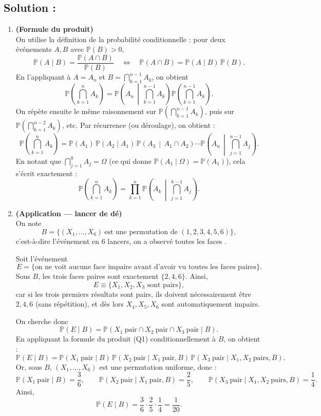 \subsection*{Solution :}


\begin{enumerate}
\item \textbf{(Formule du produit)}\\
On utilise la définition de la probabilité conditionnelle : pour deux événements $A,B$ avec $\mathbb{P}(B)>0$,
\[
\mathbb{P}(A\mid B)=\frac{\mathbb{P}(A\cap B)}{\mathbb{P}(B)}
\quad\Longleftrightarrow\quad
\mathbb{P}(A\cap B)=\mathbb{P}(A\mid B)\,\mathbb{P}(B).
\]
En l'appliquant à $A=A_n$ et $B=\bigcap_{k=1}^{n-1}A_k$, on obtient
\[
\mathbb{P}\!\left(\bigcap_{k=1}^{n}A_k\right)
=
\mathbb{P}\!\left(A_n \,\middle|\, \bigcap_{k=1}^{n-1}A_k\right)
\mathbb{P}\!\left(\bigcap_{k=1}^{n-1}A_k\right).
\]
On répète ensuite le même raisonnement sur $\mathbb{P}\!\left(\bigcap_{k=1}^{n-1}A_k\right)$, puis sur
$\mathbb{P}\!\left(\bigcap_{k=1}^{n-2}A_k\right)$, etc. Par récurrence (ou déroulage), on obtient :
\[
\mathbb{P}\left(\bigcap_{k=1}^n A_k\right)
=
\mathbb{P}(A_1)\,
\mathbb{P}(A_2\mid A_1)\,
\mathbb{P}\!\left(A_3 \,\middle|\, A_1\cap A_2\right)\cdots
\mathbb{P}\!\left(A_n \,\middle|\, \bigcap_{j=1}^{n-1}A_j\right).
\]
En notant que $\bigcap_{j=1}^{0}A_j=\Omega$ (ce qui donne $\mathbb{P}(A_1\mid \Omega)=\mathbb{P}(A_1)$),
cela s'écrit exactement :
\[
\mathbb{P}\left(\bigcap_{k=1}^n A_k\right)
=
\prod_{k=1}^n \mathbb{P}\left(A_k \,\middle|\, \bigcap_{j=1}^{k-1} A_j\right).
\]


\item \textbf{(Application — lancer de dé)}\\
On note
\[
B=\{(X_1,\dots,X_6)\ \text{est une permutation de }(1,2,3,4,5,6)\},
\]
c'est-à-dire l'événement \og en 6 lancers, on a observé toutes les faces \fg.

Soit l'événement
\[
E=\{\text{on ne voit aucune face impaire avant d'avoir vu toutes les faces paires}\}.
\]
Sous $B$, les trois faces paires sont exactement $\{2,4,6\}$. Ainsi,
\[
E \equiv \{X_1,X_2,X_3 \text{ sont pairs}\},
\]
car si les trois premiers résultats sont pairs, ils doivent nécessairement être $2,4,6$ (sans répétition),
et dès lors $X_4,X_5,X_6$ sont automatiquement impairs.

On cherche donc
\[
\mathbb{P}(E\mid B)=\mathbb{P}(X_1\ \text{pair} \cap X_2\ \text{pair} \cap X_3\ \text{pair}\mid B).
\]
En appliquant la formule du produit (Q1) conditionnellement à $B$, on obtient :
\[
\mathbb{P}(E\mid B)
=
\mathbb{P}(X_1\ \text{pair}\mid B)\,
\mathbb{P}(X_2\ \text{pair}\mid X_1\ \text{pair},B)\,
\mathbb{P}(X_3\ \text{pair}\mid X_1,X_2\ \text{pairs},B).
\]
Or, sous $B$, $(X_1,\dots,X_6)$ est une permutation uniforme, donc :
\[
\mathbb{P}(X_1\ \text{pair}\mid B)=\frac{3}{6},\qquad
\mathbb{P}(X_2\ \text{pair}\mid X_1\ \text{pair},B)=\frac{2}{5},\qquad
\mathbb{P}(X_3\ \text{pair}\mid X_1,X_2\ \text{pairs},B)=\frac{1}{4}.
\]
Ainsi,
\[
\boxed{\mathbb{P}(E\mid B)=\frac{3}{6}\cdot\frac{2}{5}\cdot\frac{1}{4}=\frac{1}{20}.}
\]

\end{enumerate}





